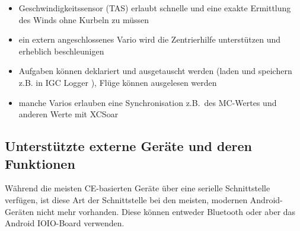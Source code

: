 \begin{itemize}
\item Geschwindigkeitssensor (TAS) erlaubt schnelle und eine exakte Ermittlung des Winds ohne Kurbeln zu müssen
\item ein extern angeschlossenes Vario wird die Zentrierhilfe unterstützen und erheblich beschleunigen
\item Aufgaben können deklariert und ausgetauscht werden (laden und speichern z.B. in IGC Logger ),   Flüge können ausgelesen werden 
\item manche Varios erlauben eine Synchronisation z.B.\ des MC-Wertes und anderen Werte mit {\textsf  XCSoar} 
\end{itemize}

\subsection*{Unterstützte externe Geräte und deren Funktionen}\label{sec:supported-varios}

\newcommand{\y}[0]{{ $\surd$ }}
\noindent{}


Während die meisten CE-basierten Geräte über eine serielle Schnittstelle verfügen, 
ist diese Art der Schnittstelle bei den meisten, modernen Android-Geräten nicht mehr vorhanden. 
Diese können entweder Bluetooth oder aber das Android IOIO-Board verwenden. 


